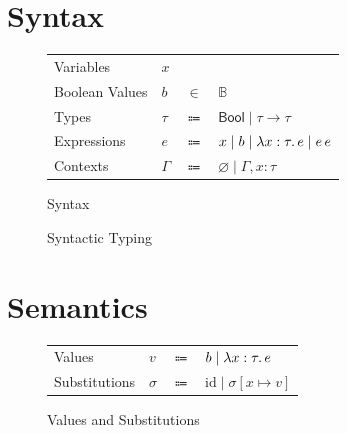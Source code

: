 \documentclass[acmsmall, screen, nonacm]{acmart}
\begin{document}
  \section{Syntax}

  \begin{figure}[ht]
    \begin{center}
      \begin{tabular}{llcl}
        Variables & $x$\\
        Boolean Values & $b$ & $\in$ & $\mathbb{B}$ \\
        Types & $\tau$ & $\Coloneq$ & $\mathsf{Bool} \mid \tau \to \tau$\\
        Expressions & $e$ & $\Coloneq$ & $x \mid b \mid \lambda x : \tau\ldotp e \mid e\,e$ \\
        Contexts & $\Gamma$ & $\Coloneq$ & $\varnothing \mid \Gamma, x : \tau$
      \end{tabular}
    \end{center}
    \caption{Syntax}
  \end{figure}

  \begin{figure}[ht]
    \caption{Syntactic Typing}
  \end{figure}

  \section{Semantics}

  \begin{figure}[ht]
    \begin{center}
      \begin{tabular}{llcl}
        Values & $v$ & $\Coloneq$ & $b \mid \lambda x : \tau\ldotp e$ \\
        Substitutions & $\sigma$ & $\Coloneq$ & $\mathrm{id} \mid \sigma[x \mapsto v]$
      \end{tabular}
    \end{center}
    \caption{Values and Substitutions}
  \end{figure}
\end{document}
